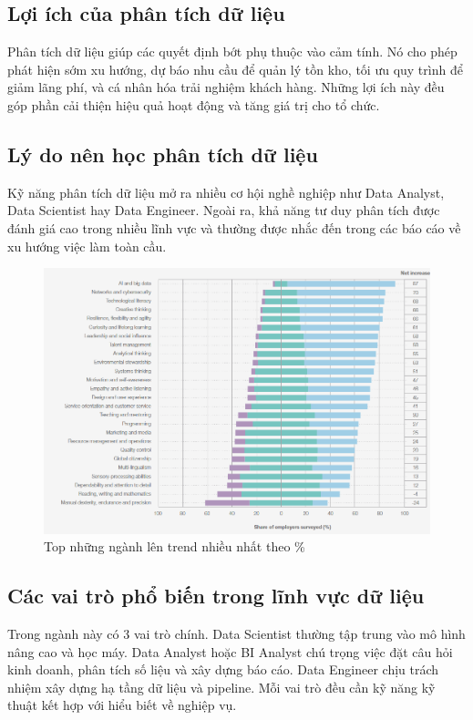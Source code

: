 \documentclass[11pt]{article}
\begin{document}
\subsection{Lợi ích của phân tích dữ liệu}
Phân tích dữ liệu giúp các quyết định bớt phụ thuộc vào cảm tính. Nó cho phép phát hiện sớm xu hướng, dự báo nhu cầu để quản lý tồn kho, tối ưu quy trình để giảm lãng phí, và cá nhân hóa trải nghiệm khách hàng. Những lợi ích này đều góp phần cải thiện hiệu quả hoạt động và tăng giá trị cho tổ chức.

\subsection{Lý do nên học phân tích dữ liệu}
Kỹ năng phân tích dữ liệu mở ra nhiều cơ hội nghề nghiệp như Data Analyst, Data Scientist hay Data Engineer. Ngoài ra, khả năng tư duy phân tích được đánh giá cao trong nhiều lĩnh vực và thường được nhắc đến trong các báo cáo về xu hướng việc làm toàn cầu.

\begin{figure}[H]
    \centering
    \includegraphics[width=1\linewidth]{images/whyStudyDA.png}
    \caption{Top những ngành lên trend nhiều nhất theo \%}
    \label{fig:job increase 2025 in percent}
\end{figure}

\subsection{Các vai trò phổ biến trong lĩnh vực dữ liệu}
Trong ngành này có 3 vai trò chính. Data Scientist thường tập trung vào mô hình nâng cao và học máy. Data Analyst hoặc BI Analyst chú trọng việc đặt câu hỏi kinh doanh, phân tích số liệu và xây dựng báo cáo. Data Engineer chịu trách nhiệm xây dựng hạ tầng dữ liệu và pipeline. Mỗi vai trò đều cần kỹ năng kỹ thuật kết hợp với hiểu biết về nghiệp vụ.
\end{document}
